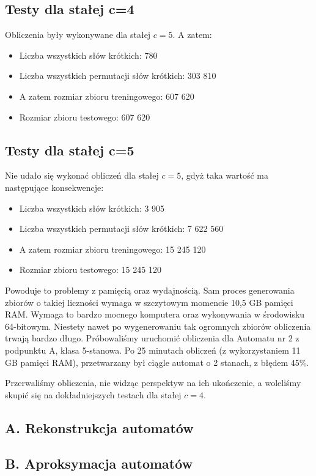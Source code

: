 \documentclass{../llncs_template_final/llncs}
\begin{document}
\subsection{Testy dla stałej c=4}
Obliczenia były wykonywane dla stałej $c = 5$. A zatem:
\begin{itemize}
\item Liczba wszystkich słów krótkich: 780
\item Liczba wszystkich permutacji słów krótkich: 303 810
\item A zatem rozmiar zbioru treningowego: 607 620
\item Rozmiar zbioru testowego: 607 620
\end{itemize}


\subsection{Testy dla stałej c=5}
Nie udało się wykonać obliczeń dla stałej $c = 5$, gdyż taka wartość ma następujące konsekwencje:
\begin{itemize}
\item Liczba wszystkich słów krótkich: 3 905
\item Liczba wszystkich permutacji słów krótkich: 7 622 560
\item A zatem rozmiar zbioru treningowego: 15 245 120
\item Rozmiar zbioru testowego: 15 245 120
\end{itemize}

Powoduje to problemy z pamięcią oraz wydajnością. Sam proces generowania zbiorów o takiej liczności wymaga w szczytowym momencie 10,5 GB pamięci RAM. Wymaga to bardzo mocnego komputera oraz wykonywania w środowisku 64-bitowym.
Niestety nawet po wygenerowaniu tak ogromnych zbiorów obliczenia trwają bardzo długo. Próbowaliśmy uruchomić obliczenia dla Automatu nr 2 z podpunktu A, klasa 5-stanowa. Po 25 minutach obliczeń (z wykorzystaniem 11 GB pamięci RAM), przetwarzany był ciągle automat o 2 stanach, z błędem 45\%. 

Przerwaliśmy obliczenia, nie widząc perspektyw na ich ukończenie, a woleliśmy skupić się na dokładniejszych testach dla stałej $c = 4$.

\subsection{A. Rekonstrukcja automatów}

\newpage

\subsection{B. Aproksymacja automatów} 
\end{document}
